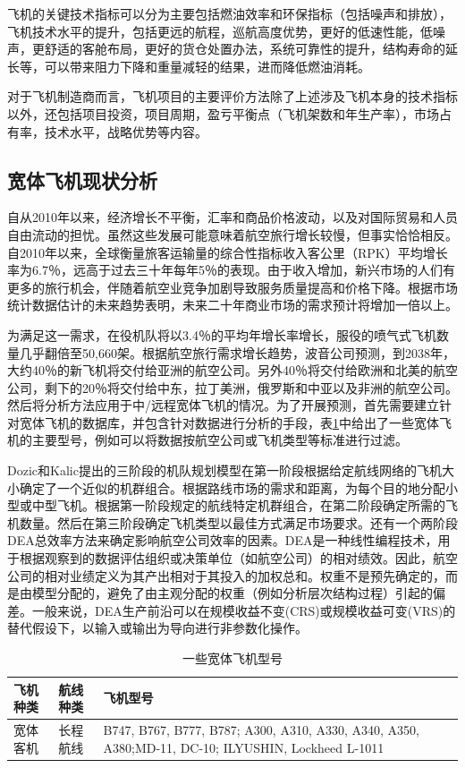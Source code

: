 \documentclass[12pt,a4paper]{report}
\begin{document}
飞机的关键技术指标可以分为主要包括燃油效率和环保指标（包括噪声和排放），飞机技术水平的提升，包括更远的航程，巡航高度优势，更好的低速性能，低噪声，更舒适的客舱布局，更好的货仓处置办法，系统可靠性的提升，结构寿命的延长等，可以带来阻力下降和重量减轻的结果，进而降低燃油消耗。

对于飞机制造商而言，飞机项目的主要评价方法除了上述涉及飞机本身的技术指标以外，还包括项目投资，项目周期，盈亏平衡点（飞机架数和年生产率），市场占有率，技术水平，战略优势等内容。

\subsection{宽体飞机现状分析}

自从2010年以来，经济增长不平衡，汇率和商品价格波动，以及对国际贸易和人员自由流动的担忧。虽然这些发展可能意味着航空旅行增长较慢，但事实恰恰相反。自2010年以来，全球衡量旅客运输量的综合性指标收入客公里（RPK）平均增长率为6.7％，远高于过去三十年每年5％的表现。由于收入增加，新兴市场的人们有更多的旅行机会，伴随着航空业竞争加剧导致服务质量提高和价格下降。根据市场统计数据估计的未来趋势表明，未来二十年商业市场的需求预计将增加一倍以上。

为满足这一需求，在役机队将以3.4％的平均年增长率增长，服役的喷气式飞机数量几乎翻倍至50,660架。根据航空旅行需求增长趋势，波音公司预测，到2038年，大约40％的新飞机将交付给亚洲的航空公司。另外40％将交付给欧洲和北美的航空公司，剩下的20％将交付给中东，拉丁美洲，俄罗斯和中亚以及非洲的航空公司。然后将分析方法应用于中/远程宽体飞机的情况。为了开展预测，首先需要建立针对宽体飞机的数据库，并包含针对数据进行分析的手段，表\ref{someaircraftdata}中给出了一些宽体飞机的主要型号，例如可以将数据按航空公司或飞机类型等标准进行过滤。

Dozic和Kalic提出的三阶段的机队规划模型在第一阶段根据给定航线网络的飞机大小确定了一个近似的机群组合。根据路线市场的需求和距离，为每个目的地分配小型或中型飞机。根据第一阶段规定的航线特定机群组合，在第二阶段确定所需的飞机数量。然后在第三阶段确定飞机类型以最佳方式满足市场要求。还有一个两阶段DEA总效率方法来确定影响航空公司效率的因素\cite{repko2017scenario}。DEA是一种线性编程技术，用于根据观察到的数据评估组织或决策单位（如航空公司）的相对绩效。因此，航空公司的相对业绩定义为其产出相对于其投入的加权总和。权重不是预先确定的，而是由模型分配的，避免了由主观分配的权重（例如分析层次结构过程）引起的偏差。一般来说，DEA生产前沿可以在规模收益不变(CRS)或规模收益可变(VRS)的替代假设下，以输入或输出为导向进行非参数化操作。

\begin{table}[ht!]
\centering
\caption{一些宽体飞机型号}
\small
\begin{tabular}{|p{2.5cm}|p{2.5cm}|p{6cm}|}
\hline \hline 
飞机种类 & 航线种类	& 飞机型号 \\ \hline
宽体客机 & 长程航线	&B747, B767, B777, B787; A300, A310, A330, A340, A350, A380;MD-11, DC-10;  ILYUSHIN, Lockheed L-1011\\ \hline
\hline
\end{tabular}
\label{someaircraftdata}
\end{table}
\end{document}
